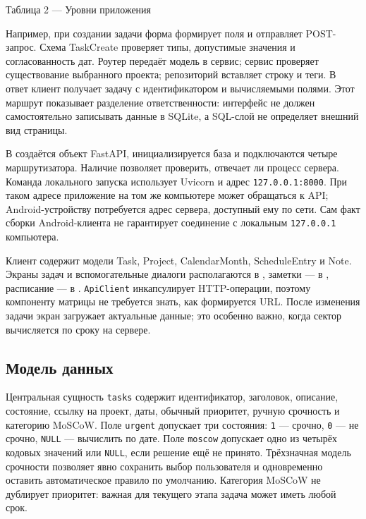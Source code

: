 \documentclass[14pt,a4paper]{extarticle}
\begin{document}
Таблица 2 --- Уровни приложения

Например, при создании задачи форма формирует поля и отправляет POST-запрос. Схема TaskCreate проверяет типы, допустимые значения и согласованность дат. Роутер передаёт модель в сервис; сервис проверяет существование выбранного проекта; репозиторий вставляет строку и теги. В ответ клиент получает задачу с идентификатором и вычисляемыми полями. Этот маршрут показывает разделение ответственности: интерфейс не должен самостоятельно записывать данные в SQLite, а SQL-слой не определяет внешний вид страницы.

В  создаётся объект FastAPI, инициализируется база и подключаются четыре маршрутизатора. Наличие  позволяет проверить, отвечает ли процесс сервера. Команда локального запуска использует Uvicorn и адрес \texttt{127.0.0.1:8000}. При таком адресе приложение на том же компьютере может обращаться к API; Android-устройству потребуется адрес сервера, доступный ему по сети. Сам факт сборки Android-клиента не гарантирует соединение с локальным \texttt{127.0.0.1} компьютера.

Клиент содержит модели Task, Project, CalendarMonth, ScheduleEntry и Note. Экраны задач и вспомогательные диалоги располагаются в , заметки --- в , расписание --- в . \texttt{ApiClient} инкапсулирует HTTP-операции, поэтому компоненту матрицы не требуется знать, как формируется URL. После изменения задачи экран загружает актуальные данные; это особенно важно, когда сектор вычисляется по сроку на сервере.

\subsection{Модель данных}

Центральная сущность \texttt{tasks} содержит идентификатор, заголовок, описание, состояние, ссылку на проект, даты, обычный приоритет, ручную срочность и категорию MoSCoW. Поле \texttt{urgent} допускает три состояния: \texttt{1} --- срочно, \texttt{0} --- не срочно, \texttt{NULL} --- вычислить по дате. Поле \texttt{moscow} допускает одно из четырёх кодовых значений или \texttt{NULL}, если решение ещё не принято. Трёхзначная модель срочности позволяет явно сохранить выбор пользователя и одновременно оставить автоматическое правило по умолчанию. Категория MoSCoW не дублирует приоритет: важная для текущего этапа задача может иметь любой срок.
\end{document}
